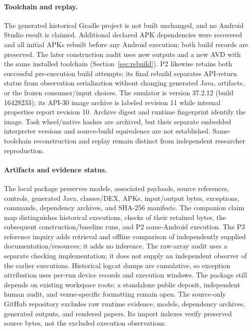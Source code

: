 \documentclass[10pt,twocolumn,letterpaper]{article}
\begin{document}
\paragraph{Toolchain and replay.}
The generated historical Gradle project is not built unchanged, and no Android Studio result is claimed. Additional declared APK dependencies were recovered and all initial APKs rebuilt before any Android execution; both build records are preserved. The later construction audit uses new outputs and a new AVD with the same installed toolchain (Section~\ref{sec:rebuild}). P2 likewise retains both successful pre-execution build attempts; its final rebuild separates API-return status from observation serialization without changing generated Java, artifacts, or the frozen consumer/input choices. The emulator is version 37.2.12 (build 16428233); its API-30 image archive is labeled revision 11 while internal properties report revision 10. Archive digest and runtime fingerprint identify the image. Task wheel/native hashes are archived, but their separate embedded interpreter versions and source-build equivalence are not established. Same-toolchain reconstruction and replay remain distinct from independent researcher reproduction.

\paragraph{Artifacts and evidence status.}
The local package preserves models, associated payloads, source references, controls, generated Java, classes/DEX, APKs, input/output bytes, exceptions, commands, dependency archives, and SHA-256 manifests. The companion claim map distinguishes historical executions, checks of their retained bytes, the subsequent construction/baseline runs, and P2 same-Android execution. The P3 reference inquiry adds retrieval and offline comparison of independently supplied documentation/resources; it adds no inference. The raw-array audit uses a separate checking implementation; it does not supply an independent observer of the earlier executions. Historical logcat dumps are cumulative, so exception attribution uses per-run device records and execution windows. The package still depends on existing workspace roots; a standalone public deposit, independent human audit, and venue-specific formatting remain open. The source-only GitHub repository excludes raw runtime evidence, models, dependency archives, generated outputs, and rendered papers. Its import indexes verify preserved source bytes, not the excluded execution observations.
\end{document}
